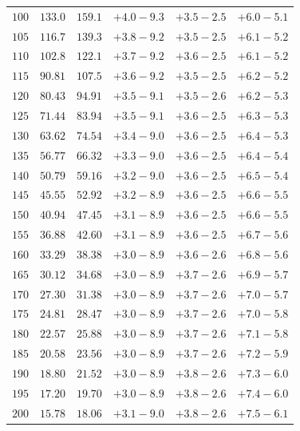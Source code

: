 \begin{table}[p]
\begin{center}
\begin{tabular}{cccccc}
$100 $&$ 133.0   $&$ 159.1 $&$  +4.0  -\!9.3 $&$ +3.5  -\!2.5 $&$  +6.0  -\!5.1 $\\
$105 $&$ 116.7   $&$ 139.3 $&$  +3.8  -\!9.2 $&$ +3.5  -\!2.5 $&$  +6.1  -\!5.2 $\\
$110 $&$ 102.8   $&$ 122.1 $&$  +3.7  -\!9.2 $&$ +3.6  -\!2.5 $&$  +6.1  -\!5.2 $\\
$115 $&$  90.81  $&$ 107.5 $&$  +3.6  -\!9.2 $&$ +3.5  -\!2.5 $&$  +6.2  -\!5.2 $\\
$120 $&$  80.43  $&$  94.91 $&$  +3.5  -\!9.1 $&$ +3.5  -\!2.6 $&$  +6.2  -\!5.3 $\\
$125 $&$  71.44  $&$  83.94 $&$  +3.5  -\!9.1 $&$ +3.6  -\!2.5 $&$  +6.3  -\!5.3 $\\
$130 $&$  63.62  $&$  74.54 $&$  +3.4  -\!9.0 $&$ +3.6  -\!2.5 $&$  +6.4  -\!5.3 $\\
$135 $&$  56.77  $&$  66.32 $&$  +3.3  -\!9.0 $&$ +3.6  -\!2.5 $&$  +6.4  -\!5.4 $\\
$140 $&$  50.79  $&$  59.16 $&$  +3.2  -\!9.0 $&$ +3.6  -\!2.5 $&$  +6.5  -\!5.4 $\\
$145 $&$  45.55  $&$  52.92 $&$  +3.2  -\!8.9 $&$ +3.6  -\!2.5 $&$  +6.6  -\!5.5 $\\
$150 $&$  40.94  $&$  47.45 $&$  +3.1  -\!8.9 $&$ +3.6  -\!2.5 $&$  +6.6  -\!5.5 $\\
$155 $&$  36.88  $&$  42.60 $&$  +3.1  -\!8.9 $&$ +3.6  -\!2.5 $&$  +6.7  -\!5.6 $\\
$160 $&$  33.29  $&$  38.38 $&$  +3.0  -\!8.9 $&$ +3.6  -\!2.6 $&$  +6.8  -\!5.6 $\\
$165 $&$  30.12  $&$  34.68 $&$  +3.0  -\!8.9 $&$ +3.7  -\!2.6 $&$  +6.9  -\!5.7 $\\
$170 $&$  27.30  $&$  31.38 $&$  +3.0  -\!8.9 $&$ +3.7  -\!2.6 $&$  +7.0  -\!5.7 $\\
$175 $&$  24.81  $&$  28.47 $&$  +3.0  -\!8.9 $&$ +3.7  -\!2.6 $&$  +7.0  -\!5.8 $\\
$180 $&$  22.57  $&$  25.88 $&$  +3.0  -\!8.9 $&$ +3.7  -\!2.6 $&$  +7.1  -\!5.8 $\\
$185 $&$  20.58  $&$  23.56 $&$  +3.0  -\!8.9 $&$ +3.7  -\!2.6 $&$  +7.2  -\!5.9 $\\
$190 $&$  18.80  $&$  21.52 $&$  +3.0  -\!8.9 $&$ +3.8  -\!2.6 $&$  +7.3  -\!6.0 $\\
$195 $&$  17.20  $&$  19.70 $&$  +3.0  -\!8.9 $&$ +3.8  -\!2.6 $&$  +7.4  -\!6.0 $\\
$200 $&$  15.78  $&$  18.06 $&$  +3.1  -\!9.0 $&$ +3.8  -\!2.6 $&$  +7.5  -\!6.1 $\\

\end{tabular}
\end{center}
\end{table}

